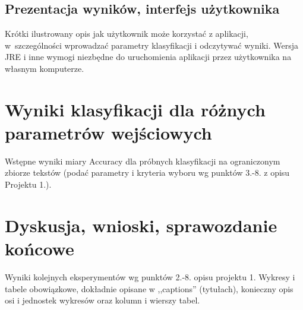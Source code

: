 \documentclass{classrep}
\begin{document}
\subsection{Prezentacja wyników, interfejs użytkownika} 
Krótki ilustrowany opis jak użytkownik może korzystać z aplikacji, w~szczególności wprowadzać parametry klasyfikacji i odczytywać wyniki. Wersja JRE i inne wymogi
niezbędne do uruchomienia aplikacji przez użytkownika na własnym komputerze. \\

\section{Wyniki klasyfikacji dla różnych parametrów wejściowych}
Wstępne wyniki miary Accuracy dla próbnych klasyfikacji na ograniczonym zbiorze tekstów (podać parametry i kryteria
wyboru wg punktów 3.-8. z opisu Projektu 1.). 


\section{Dyskusja, wnioski, sprawozdanie końcowe}

Wyniki kolejnych eksperymentów wg punktów 2.-8. opisu projektu 1.  Wykresy i tabele
obowiązkowe, dokładnie opisane w ,,captions'' (tytułach), konieczny opis osi i
jednostek wykresów oraz kolumn i wierszy tabel.\\ 
\end{document}

